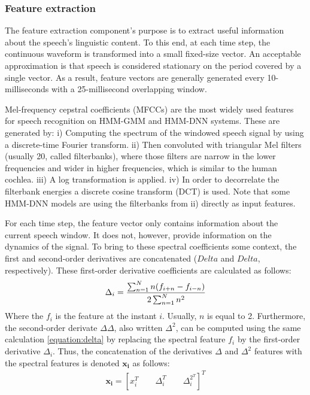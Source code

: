 \subsubsection{Feature extraction}%
The feature extraction component's purpose is to extract useful information about the speech's linguistic content. To this end, at each time step, the continuous waveform is transformed into a small fixed-size vector. An acceptable approximation is that speech is considered stationary on the period covered by a single vector. As a result, feature vectors are generally generated every 10-milliseconds with a 25-millisecond overlapping window.

Mel-frequency cepstral coefficients (MFCCs) \cite{mfcc} are the most widely used features for speech recognition on HMM-GMM and HMM-DNN systems. These are generated by: i) Computing the spectrum of the windowed speech signal by using a discrete-time Fourier transform. ii) Then convoluted with triangular Mel filters (usually 20, called filterbanks), where those filters are narrow in the lower frequencies and wider in higher frequencies, which is similar to the human cochlea. iii) A log transformation is applied. iv) In order to decorrelate the filterbank energies a discrete cosine transform (DCT) is used. Note that some HMM-DNN models are using the filterbanks from ii) directly as input features.

For each time step, the feature vector only contains information about the current speech window. It does not, however, provide information on the dynamics of the signal. To bring to these spectral coefficients some context, the first and second-order derivatives are concatenated ($Delta$ and $Delta$, respectively). These first-order derivative coefficients are calculated as follows:
\begin{equation}
 \label{equation:delta}
    \Delta_i = \frac{\sum^{N}_{n=1}n(f_{i+n} - f_{i-n})}{2 \sum^N_{n=1}n^2} \\
\end{equation}
Where the $f_i$ is the feature at the instant $i$. Usually, $n$ is equal to 2. Furthermore, the second-order derivate $\Delta\Delta$, also written $\Delta^2$, can be computed using the same calculation \ref{equation:delta} by replacing the spectral feature $f_i$ by the first-order derivative $\Delta_i$. Thus, the concatenation of the derivatives $\Delta$ and $\Delta^2$ features with the spectral features is denoted $\boldsymbol{x_i}$ as follows:
\begin{align}
    \boldsymbol{x_i} = [x_i^T \qquad \Delta_i^T \qquad \Delta^{2^T}_i]^T
\end{align}
